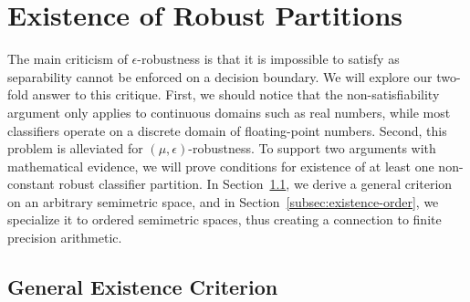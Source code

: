 \section{Existence of Robust Partitions}
\label{sec:existence}

The main criticism of $\epsilon$-robustness is that it is impossible to satisfy as separability cannot be enforced on a decision boundary. We will explore our two-fold answer to this critique. First, we should notice that the non-satisfiability argument only applies to continuous domains such as real numbers, while most classifiers operate on a discrete domain of floating-point numbers. Second, this problem is alleviated for $(\mu,\epsilon)$-robustness. To support two arguments with mathematical evidence, we will prove conditions for existence of at least one non-constant robust classifier partition. In Section~\ref{subsec:general-existence}, we derive a general criterion on an arbitrary semimetric space, and in Section~\ref{subsec:existence-order}, we specialize it to ordered semimetric spaces, thus creating a connection to finite precision arithmetic.

\subsection{General Existence Criterion}
\label{subsec:general-existence}

